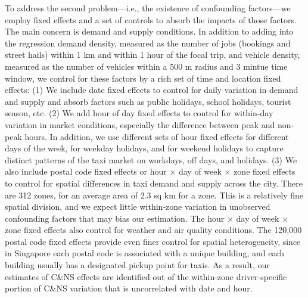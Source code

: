 \documentclass[reviewmode]{restud}
\begin{document}
To address the second problem---i.e., the existence of confounding factors---we employ fixed effects and a set of controls to absorb the impacts of those factors. The main concern is  demand and supply conditions. In addition to adding  into the regression demand density, measured as the number of jobs (bookings and street hails) within 1 km and within 1 hour of the focal trip, and vehicle density, measured as the number of vehicles within a 500 m radius and 3 mintue time window, we control for these factors by a rich set of time and location fixed effects: (1) We include date fixed effects to control for daily variation in demand and supply and absorb factors such as public holidays, school holidays, tourist season, etc. (2) We add hour of day fixed effects to control for within-day variation in market conditions, especially the difference between peak and non-peak hours. In addition, we use different sets of hour fixed effects for different days of the week, for weekday holidays, and for weekend holidays to capture distinct patterns of the taxi market on workdays, off days, and holidays. (3)  We also include postal code fixed effects or hour $\times$ day of week $\times$ zone fixed effects to control for spatial differences in taxi demand and supply across the city. There are 312 zones, for an average area of 2.3 sq km for a zone. This is a relatively fine spatial division, and we expect little within-zone variation in unobserved confounding factors that may bias our estimation. The  hour $\times$ day of week $\times$ zone fixed effects also control for weather and air quality conditions. The 120,000 postal code fixed effects provide even finer control for spatial heterogeneity, since in Singapore each postal code is associated with a unique building, and each building usually has a designated pickup point for taxis. As a result, our estimates of C\&NS effects are identified out of the within-zone driver-specific portion of C\&NS variation that is uncorrelated with date and hour. %
\end{document}
